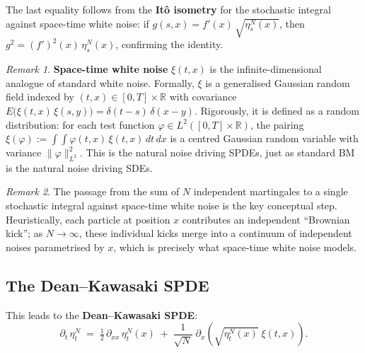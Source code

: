 \documentclass[11pt]{article}
\theoremstyle{definition}
\theoremstyle{remark}
\newtheorem{remark}{Remark}
\begin{document}

The last equality follows from the \textbf{Itô isometry}
for the stochastic integral against space-time white noise:
if $g(s,x) = f'(x)\,\sqrt{\eta_s^N(x)}$, then
$g^2 = (f')^2(x)\,\eta_s^N(x)$, confirming the identity.

\begin{remark}
\textbf{Space-time white noise} $\xi(t,x)$ is the
infinite-dimensional analogue of standard white noise.
Formally, $\xi$ is a generalised Gaussian random field
indexed by $(t,x) \in [0,T] \times \mathbb{R}$ with
covariance
$E\!\bigl(\xi(t,x)\,\xi(s,y)\bigr) = \delta(t-s)\,\delta(x-y)$.
Rigorously, it is defined as a random distribution:
for each test function $\varphi \in L^2([0,T] \times \mathbb{R})$,
the pairing $\xi(\varphi) := \int\!\!\int \varphi(t,x)\,\xi(t,x)\,dt\,dx$
is a centred Gaussian random variable with variance
$\|\varphi\|_{L^2}^2$.  This is the natural noise driving SPDEs,
just as standard BM is the natural noise driving SDEs.
\end{remark}

\begin{remark}
The passage from the sum of $N$ independent martingales to a
single stochastic integral against space-time white noise
is the key conceptual step.  Heuristically, each particle at
position $x$ contributes an independent ``Brownian kick'';
as $N \to \infty$, these individual kicks merge into a
continuum of independent noises parametrised by $x$, which is
precisely what space-time white noise models.
\end{remark}

\subsection*{The Dean--Kawasaki SPDE}


This leads to the \textbf{Dean--Kawasaki SPDE}:
\[
    \boxed{
        \partial_t\,\eta_t^N
        \;=\;
        \tfrac{1}{2}\,\partial_{xx}\,\eta_t^N(x)
        \;+\;
        \frac{1}{\sqrt{N}}\;\partial_x\!\left(
            \sqrt{\eta_t^N(x)}\;\xi(t, x)
        \right).
    }
\]
\end{document}
